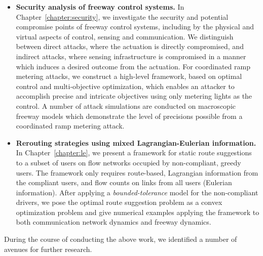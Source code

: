 \begin{itemize}
	\item \textbf{Security analysis of freeway control systems.} In Chapter~\ref{chapter:security}, we investigate the security and potential compromise points of freeway control systems, including by the physical and virtual aspects of control, sensing and communication. We distinguish between direct attacks, where the actuation is directly compromised, and indirect attacks, where sensing infrastructure is compromised in a manner which induces a desired outcome from the actuation. For coordinated ramp metering attacks, we construct a high-level framework, based on optimal control and multi-objective optimization, which enables an attacker to accomplish precise and intricate objectives using only metering lights as the control. A number of attack simulations are conducted on macroscopic freeway models which demonstrate the level of precisions possible from a coordinated ramp metering attack.
	\item \textbf{Rerouting strategies using mixed Lagrangian-Eulerian information.} In Chapter~\ref{chapter:le}, we present a framework for static route suggestions to a subset of users on flow networks occupied by non-compliant, greedy users. The framework only requires route-based, Lagrangian information from the compliant users, and flow counts on links from all users (Eulerian information). After applying a \emph{bounded-tolerance} model for the non-compliant drivers, we pose the optimal route suggestion problem as a convex optimization problem and give numerical examples applying the framework to both communication network dynamics and freeway dynamics.
\end{itemize}

During the course of conducting the above work, we identified a number of avenues for further research.

